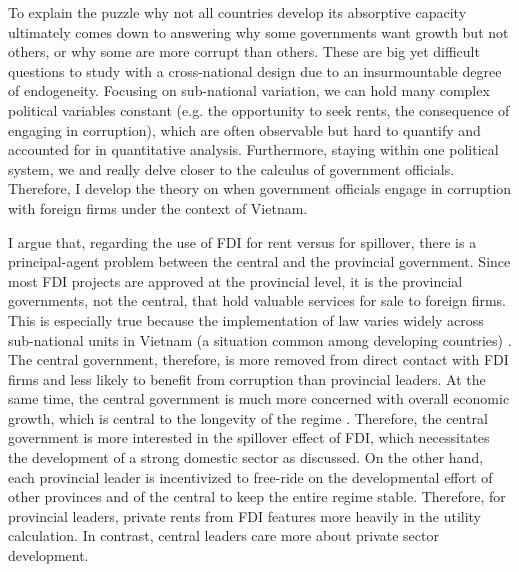 \documentclass[12pt]{article}
\begin{document}
To explain the puzzle why not all countries develop its absorptive capacity ultimately comes down to answering why some governments want growth but not others, or why some are more corrupt than others. These are big yet difficult questions to study with a cross-national design due to an insurmountable degree of endogeneity. Focusing on sub-national variation, we can hold many complex political variables constant (e.g. the opportunity to seek rents, the consequence of engaging in corruption), which are often observable but hard to quantify and accounted for in quantitative analysis. Furthermore, staying within one political system, we and really delve closer to the calculus of government officials. Therefore, I develop the theory on when government officials engage in corruption with foreign firms under the context of Vietnam.

I argue that, regarding the use of FDI for rent versus for spillover, there is a principal-agent problem between the central and the provincial government. Since most FDI projects are approved at the provincial level, it is the provincial governments, not the central, that hold valuable services for sale to foreign firms. This is especially true because the implementation of law varies widely across sub-national units in Vietnam (a situation common among developing countries) \citep{Meyer2005, Thun2006}. The central government, therefore, is more removed from direct contact with FDI firms and less likely to benefit from corruption than provincial leaders. At the same time, the central government is much more concerned with overall economic growth, which is central to the longevity of the regime \citep{Malesky2008}. Therefore, the central government is more interested in the spillover effect of FDI, which necessitates the development of a strong domestic sector as discussed.  On the other hand, each provincial leader is incentivized to free-ride on the developmental effort of other provinces and of the central to keep the entire regime stable. Therefore, for provincial leaders, private rents from FDI features more heavily in the utility calculation. In contrast, central leaders care more about private sector development.
\end{document}
